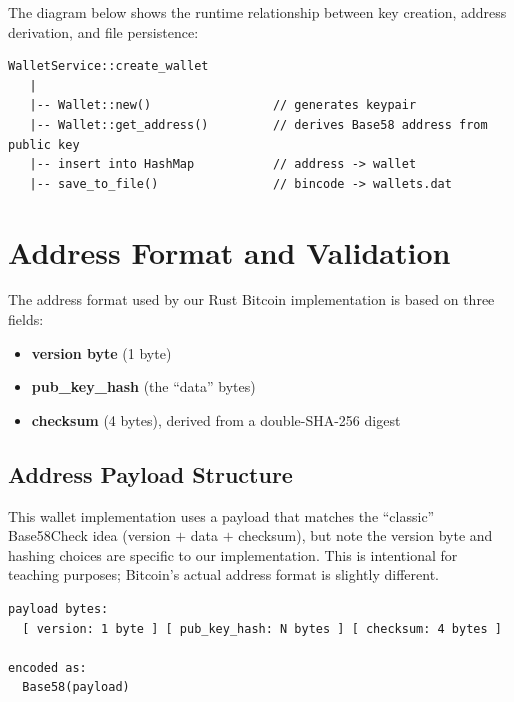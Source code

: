 The diagram below shows the runtime relationship between key creation, address derivation, and file persistence:

\begin{verbatim}
WalletService::create_wallet
   |
   |-- Wallet::new()                 // generates keypair
   |-- Wallet::get_address()         // derives Base58 address from public key
   |-- insert into HashMap           // address -> wallet
   |-- save_to_file()                // bincode -> wallets.dat
\end{verbatim}

\section{Address Format and Validation}
\label{sec:address-format}

The address format used by our Rust Bitcoin implementation is based on three fields:

\begin{itemize}
  \item \textbf{version byte} (1 byte)
  \item \textbf{pub\_key\_hash} (the ``data'' bytes)
  \item \textbf{checksum} (4 bytes), derived from a double-SHA-256 digest
\end{itemize}

\subsection{Address Payload Structure}
\label{sec:address-payload}

This wallet implementation uses a payload that matches the ``classic'' Base58Check idea (version $+$ data $+$ checksum), but note the version byte and hashing choices are specific to our implementation. This is intentional for teaching purposes; Bitcoin's actual address format is slightly different.

\begin{verbatim}
payload bytes:
  [ version: 1 byte ] [ pub_key_hash: N bytes ] [ checksum: 4 bytes ]

encoded as:
  Base58(payload)
\end{verbatim}

